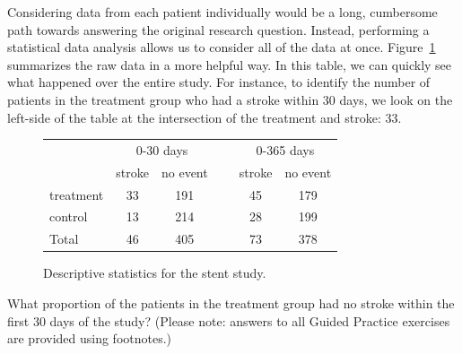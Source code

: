 Considering data from each patient individually would be a long, cumbersome path towards answering the original research question. Instead, performing a statistical data analysis allows us to consider all of the data at once. Figure~\ref{stentStudyResults} summarizes the raw data in a more helpful way. In this table, we can quickly see what happened over the entire study. For instance, to identify the number of patients in the treatment group who had a stroke within 30 days, we look on the left-side of the table at the intersection of the treatment and stroke: 33.

\begin{figure}[h]
\centering
\begin{tabular}{l cc c cc}
& \multicolumn{2}{c}{0-30 days} &\hspace{5mm}\ & \multicolumn{2}{c}{0-365 days} \\
  \cline{2-3} \cline{5-6}
	& 	stroke 	& no event && 	stroke 	& no event \\
  \hline
treatment 	& 33		& 191	&&	45 	& 179 \\
control 		& 13		& 214	&& 	28	& 199 \\
  \hline
Total				& 46		& 405	&&	73	& 378 \\
  \hline
\end{tabular}
\caption{Descriptive statistics for the stent study.}
\label{stentStudyResults}
\end{figure}

\begin{exercisewrap}
\begin{nexercise}
What proportion of the patients in the treatment group had no stroke within the first 30 days of the study? (Please note: answers to all Guided Practice exercises are provided using footnotes.)\footnotemark
\end{nexercise}
\end{exercisewrap}

